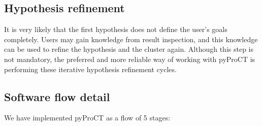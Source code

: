 \subsection{Hypothesis refinement}

It is very likely that the first hypothesis does not  define the user's goals completely. Users may gain knowledge from result inspection, and this knowledge can be used to refine the hypothesis and the cluster again. Although this step is not mandatory, the preferred and more reliable way of working with pyProCT is performing these iterative hypothesis refinement cycles.

\subsection{Software flow detail}

We have implemented pyProCT as a flow of 5 stages: 


